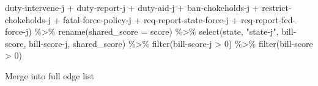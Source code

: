 \documentclass[
  letterpaper,
  DIV=11,
  numbers=noendperiod]{scrartcl}
\newenvironment{Shaded}{\begin{snugshade}}{\end{snugshade}}
\newcommand{\AttributeTok}[1]{\textcolor[rgb]{0.40,0.45,0.13}{#1}}
\newcommand{\DecValTok}[1]{\textcolor[rgb]{0.68,0.00,0.00}{#1}}
\newcommand{\FunctionTok}[1]{\textcolor[rgb]{0.28,0.35,0.67}{#1}}
\newcommand{\NormalTok}[1]{\textcolor[rgb]{0.00,0.23,0.31}{#1}}
\newcommand{\SpecialCharTok}[1]{\textcolor[rgb]{0.37,0.37,0.37}{#1}}
\newcommand{\StringTok}[1]{\textcolor[rgb]{0.13,0.47,0.30}{#1}}
\begin{document}
\begin{Shaded}
\begin{Highlighting}[]
           \StringTok{\textasciigrave{}}\AttributeTok{duty{-}intervene{-}j}\StringTok{\textasciigrave{}} \SpecialCharTok{+}
           \StringTok{\textasciigrave{}}\AttributeTok{duty{-}report{-}j}\StringTok{\textasciigrave{}} \SpecialCharTok{+}
           \StringTok{\textasciigrave{}}\AttributeTok{duty{-}aid{-}j}\StringTok{\textasciigrave{}} \SpecialCharTok{+}
           \StringTok{\textasciigrave{}}\AttributeTok{ban{-}chokeholds{-}j}\StringTok{\textasciigrave{}} \SpecialCharTok{+}
           \StringTok{\textasciigrave{}}\AttributeTok{restrict{-}chokeholds{-}j}\StringTok{\textasciigrave{}} \SpecialCharTok{+}
           \StringTok{\textasciigrave{}}\AttributeTok{fatal{-}force{-}policy{-}j}\StringTok{\textasciigrave{}} \SpecialCharTok{+}
           \StringTok{\textasciigrave{}}\AttributeTok{req{-}report{-}state{-}force{-}j}\StringTok{\textasciigrave{}} \SpecialCharTok{+}
           \StringTok{\textasciigrave{}}\AttributeTok{req{-}report{-}fed{-}force{-}j}\StringTok{\textasciigrave{}}\NormalTok{) }\SpecialCharTok{\%\textgreater{}\%} 
  \FunctionTok{rename}\NormalTok{(}\AttributeTok{shared\_score =}\NormalTok{ score) }\SpecialCharTok{\%\textgreater{}\%} 
  \FunctionTok{select}\NormalTok{(state, }\StringTok{"state{-}j"}\NormalTok{, }\StringTok{\textasciigrave{}}\AttributeTok{bill{-}score}\StringTok{\textasciigrave{}}\NormalTok{, }\StringTok{\textasciigrave{}}\AttributeTok{bill{-}score{-}j}\StringTok{\textasciigrave{}}\NormalTok{, shared\_score) }\SpecialCharTok{\%\textgreater{}\%} 
  \FunctionTok{filter}\NormalTok{(}\StringTok{\textasciigrave{}}\AttributeTok{bill{-}score{-}j}\StringTok{\textasciigrave{}} \SpecialCharTok{\textgreater{}} \DecValTok{0}\NormalTok{) }\SpecialCharTok{\%\textgreater{}\%} 
  \FunctionTok{filter}\NormalTok{(}\StringTok{\textasciigrave{}}\AttributeTok{bill{-}score}\StringTok{\textasciigrave{}} \SpecialCharTok{\textgreater{}} \DecValTok{0}\NormalTok{) }
\end{Highlighting}
\end{Shaded}

Merge into full edge list
\end{document}
